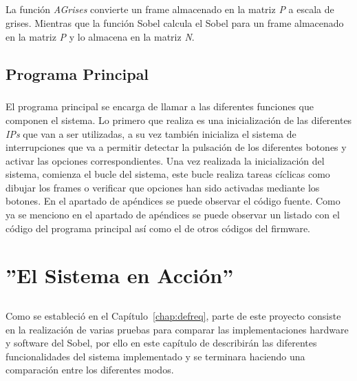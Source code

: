 \documentclass[a4paper,12pt,titlepage,final]{book}
\begin{document}


\paragraph{}
La función \textit{AGrises} convierte un frame almacenado en la matriz \textit{P} a escala de grises. Mientras que la función Sobel calcula el Sobel para un frame almacenado en la matriz \textit{P} y lo almacena en la matriz \textit{N}. 


\section{Programa Principal}
\paragraph{}
El programa principal se encarga de llamar a las diferentes funciones que componen el sistema. Lo primero que realiza es una inicialización de las diferentes \textit{IPs} que van a ser utilizadas, a su vez también inicializa el sistema de interrupciones que va a permitir detectar la pulsación de los diferentes botones y activar las opciones correspondientes. Una vez realizada la inicialización del sistema, comienza el bucle del sistema, este bucle realiza tareas cíclicas como dibujar los frames o verificar que opciones han sido activadas mediante los botones. En el apartado de apéndices se puede observar el código fuente. Como ya se menciono en el apartado de apéndices se puede observar un listado con el código del programa principal así como el de otros códigos del firmware.


\chapter{''El Sistema en Acción''}
\section*{}
\subsection*{}
\subsubsection*{}

\paragraph{}
Como se estableció en el Capítulo~\ref{chap:defreq}, parte de este proyecto consiste en la realización de varias pruebas para comparar las implementaciones hardware y software del Sobel, por ello en este capítulo de describirán las diferentes funcionalidades del sistema implementado y se terminara haciendo una comparación entre los diferentes modos.
\end{document}
